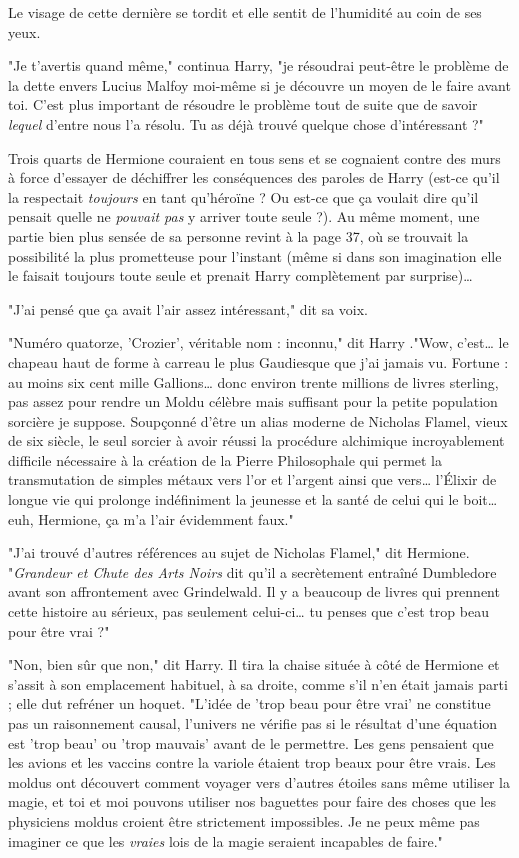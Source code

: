 Le visage de cette dernière se tordit et elle sentit de l'humidité au coin de ses yeux.

"Je t'avertis quand même," continua Harry, "je résoudrai peut-être le problème de la dette envers Lucius Malfoy moi-même si je découvre un moyen de le faire avant toi. C'est plus important de résoudre le problème tout de suite que de savoir \emph{lequel}  d'entre nous l'a résolu. Tu as déjà trouvé quelque chose d'intéressant ?"

Trois quarts de Hermione couraient en tous sens et se cognaient contre des murs à force d'essayer de déchiffrer les conséquences des paroles de Harry (est-ce qu'il la respectait \emph{toujours}  en tant qu'héroïne ? Ou est-ce que ça voulait dire qu'il pensait quelle ne \emph{pouvait pas}  y arriver toute seule ?). Au même moment, une partie bien plus sensée de sa personne revint à la page 37, où se trouvait la possibilité la plus prometteuse pour l'instant (même si dans son imagination elle le faisait toujours toute seule et prenait Harry complètement par surprise)…

"J'ai pensé que ça avait l'air assez intéressant," dit sa voix.

"Numéro quatorze, 'Crozier', véritable nom : inconnu," dit Harry ."Wow, c'est… le chapeau haut de forme à carreau le plus Gaudiesque que j'ai jamais vu. Fortune : au moins six cent mille Gallions… donc environ trente millions de livres sterling, pas assez pour rendre un Moldu célèbre mais suffisant pour la petite population sorcière je suppose. Soupçonné d'être un alias moderne de Nicholas Flamel, vieux de six siècle, le seul sorcier à avoir réussi la procédure alchimique incroyablement difficile nécessaire à la création de la Pierre Philosophale qui permet la transmutation de simples métaux vers l'or et l'argent ainsi que vers… l'Élixir de longue vie qui prolonge indéfiniment la jeunesse et la santé de celui qui le boit… euh, Hermione, ça m'a l'air évidemment faux."

"J'ai trouvé d'autres références au sujet de Nicholas Flamel," dit Hermione. "\emph{Grandeur et Chute des Arts Noirs}  dit qu'il a secrètement entraîné Dumbledore avant son affrontement avec Grindelwald. Il y a beaucoup de livres qui prennent cette histoire au sérieux, pas seulement celui-ci… tu penses que c'est trop beau pour être vrai ?"

"Non, bien sûr que non," dit Harry. Il tira la chaise située à côté de Hermione et s'assit à son emplacement habituel, à sa droite, comme s'il n'en était jamais parti ; elle dut refréner un hoquet. "L'idée de 'trop beau pour être vrai' ne constitue pas un raisonnement causal, l'univers ne vérifie pas si le résultat d'une équation est 'trop beau' ou 'trop mauvais' avant de le permettre. Les gens pensaient que les avions et les vaccins contre la variole étaient trop beaux pour être vrais. Les moldus ont découvert comment voyager vers d'autres étoiles sans même utiliser la magie, et toi et moi pouvons utiliser nos baguettes pour faire des choses que les physiciens moldus croient être strictement impossibles. Je ne peux même pas imaginer ce que les \emph{vraies}  lois de la magie seraient incapables de faire."


